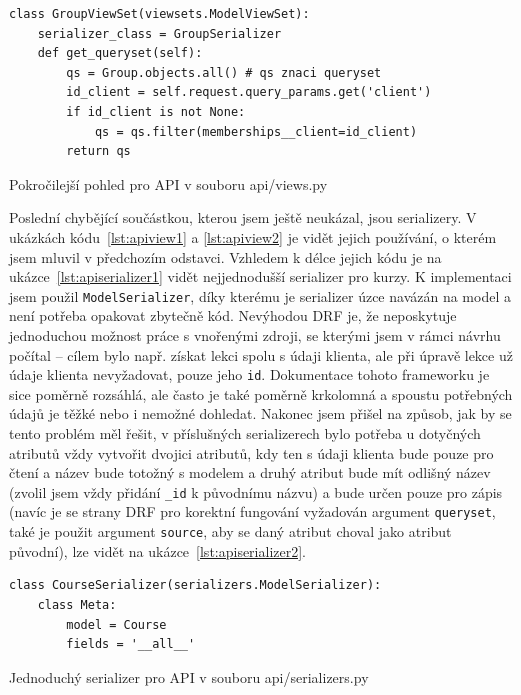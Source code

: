     \begin{listing}[ht]
    	\begin{verbatim}
class GroupViewSet(viewsets.ModelViewSet):
    serializer_class = GroupSerializer
    def get_queryset(self):
        qs = Group.objects.all() # qs znaci queryset
        id_client = self.request.query_params.get('client')
        if id_client is not None:
            qs = qs.filter(memberships__client=id_client)
        return qs
    	\end{verbatim}
    	\caption{Pokročilejší pohled pro API v souboru api/views.py}\label{lst:apiview2}
    \end{listing}
    
    Poslední chybějící součástkou, kterou jsem ještě neukázal, jsou serializery. V ukázkách kódu~\ref{lst:apiview1} a \ref{lst:apiview2} je vidět jejich používání, o kterém jsem mluvil v předchozím odstavci. Vzhledem k délce jejich kódu je na ukázce~\ref{lst:apiserializer1} vidět nejjednodušší serializer pro kurzy. K implementaci jsem použil \verb|ModelSerializer|, díky kterému je serializer úzce navázán na model a není potřeba opakovat zbytečně kód. Nevýhodou DRF je, že neposkytuje jednoduchou možnost práce s vnořenými zdroji, se kterými jsem v rámci návrhu počítal -- cílem bylo např. získat lekci spolu s údaji klienta, ale při úpravě lekce už údaje klienta nevyžadovat, pouze jeho \verb|id|. Dokumentace tohoto frameworku je sice poměrně rozsáhlá, ale často je také poměrně krkolomná a spoustu potřebných údajů je těžké nebo i nemožné dohledat. Nakonec jsem přišel na způsob, jak by se tento problém měl řešit, v příslušných serializerech bylo potřeba u dotyčných atributů vždy vytvořit dvojici atributů, kdy ten s údaji klienta bude pouze pro čtení a název bude totožný s modelem a druhý atribut bude mít odlišný název (zvolil jsem vždy přidání \verb|_id| k původnímu názvu) a bude určen pouze pro zápis (navíc je se strany DRF pro korektní fungování vyžadován argument \verb|queryset|, také je použit argument \verb|source|, aby se daný atribut choval jako atribut původní), lze vidět na ukázce~\ref{lst:apiserializer2}. 
    
    \begin{listing}[ht]
    	\begin{verbatim}
class CourseSerializer(serializers.ModelSerializer):
    class Meta:
        model = Course
        fields = '__all__'
    	\end{verbatim}
    	\caption{Jednoduchý serializer pro API v souboru api/serializers.py}\label{lst:apiserializer1}
    \end{listing}
    
